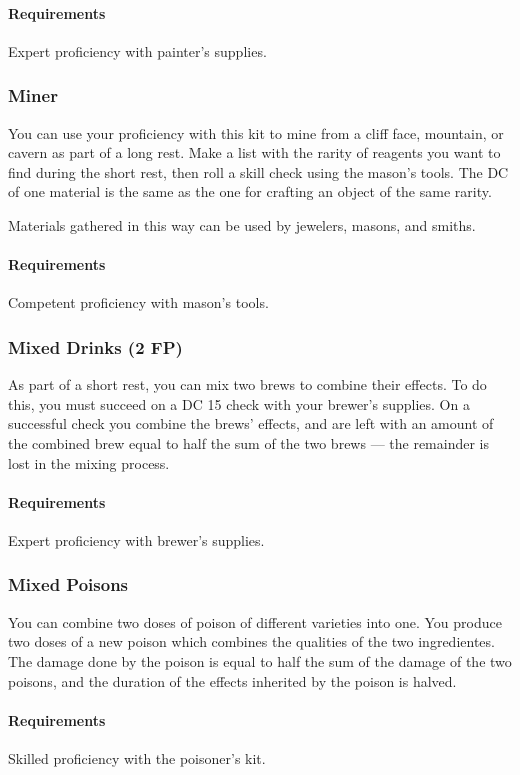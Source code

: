     \paragraph{Requirements} Expert proficiency with painter's supplies.
\subsubsection{Miner} \label{feat::miner}
    You can use your proficiency with this kit to mine from a cliff face, mountain, or cavern as part of a long rest.
    Make a list with the rarity of reagents you want to find during the short rest, then roll a skill check using the mason's tools.
    The DC of one material is the same as the one for crafting an object of the same rarity.

    Materials gathered in this way can be used by jewelers, masons, and smiths.
    \paragraph{Requirements} Competent proficiency with mason's tools.
\subsubsection{Mixed Drinks (2 FP)} \label{feat::mixeddrinks}
    As part of a short rest, you can mix two brews to combine their effects.
    To do this, you must succeed on a DC 15 check with your brewer's supplies.
    On a successful check you combine the brews' effects, and are left with an amount of the combined brew equal to half the sum of the two brews --- the remainder is lost in the mixing process.
    \paragraph{Requirements} Expert proficiency with brewer's supplies.
\subsubsection{Mixed Poisons} \label{feat::mixedpoisons}
    You can combine two doses of poison of different varieties into one.
    You produce two doses of a new poison which combines the qualities of the two ingredientes.
    The damage done by the poison is equal to half the sum of the damage of the two poisons, and the duration of the effects inherited by the poison is halved.
    \paragraph{Requirements} Skilled proficiency with the poisoner's kit.
